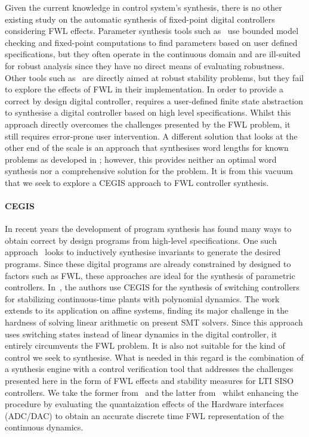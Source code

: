 \documentclass{sig-alternate-05-2015}
\begin{document}
Given the current knowledge in control system's synthesis, there is no other
existing study on the automatic synthesis of fixed-point digital controllers
considering FWL effects.  Parameter synthesis tools such
as~\cite{cimatti2013parameter} use bounded model checking and fixed-point
computations to find parameters based on user defined specifications, but
they often operate in the continuous domain and are ill-suited for robust
analysis since they have no direct means of evaluating robustness.  Other
tools such as~\cite{economakos2016automated} are directly aimed at robust
stability problems, but they fail to explore the effects of FWL in their
implementation.  In order to provide a correct by design digital controller,
\cite{alur2016compositional} requires a user-defined finite state
abstraction to synthesise a digital controller based on high level
specifications.  Whilst this approach directly overcomes the challenges
presented by the FWL problem, it still requires error-prone user
intervention.  A different solution that looks at the other end of the scale
is an approach that synthesises word lengths for known problems as developed
in \cite{jha2013swati}; however, this provides neither an optimal word
synthesis nor a comprehensive solution for the problem.  It is from this
vacuum that we seek to explore a CEGIS approach to FWL controller synthesis.

\paragraph{CEGIS}

In recent years the development of program synthesis has found many ways to
obtain correct by design programs from high-level specifications.  One such
approach~\cite{itzhaky2010simple} looks to inductively synthesise invariants
to generate the desired programs.  Since these digital programs are already
constrained by designed to factors such as FWL, these approaches are ideal
for the synthesis of parametric controllers. 
In~\cite{DBLP:conf/cdc/RavanbakhshS15}, the authors use CEGIS for the
synthesis of switching controllers for stabilizing continuous-time plants
with polynomial dynamics.  The work extends to its application on affine
systems, finding its major challenge in the hardness of solving linear
arithmetic on present SMT solvers.  Since this approach uses switching
states instead of linear dynamics in the digital controller, it entirely
circumvents the FWL problem.  It is also not suitable for the kind of
control we seek to synthesise.  What is needed in this regard is the
combination of a synthesis engine with a control verification tool that
addresses the challenges presented here in the form of FWL effects and
stability measures for LTI SISO controllers.  We take the former
from~\cite{DBLP:conf/lpar/DavidKL15} and the latter from~\cite{daes20161}
whilst enhancing the procedure by evaluating the quantaization effects of
the Hardware interfaces (ADC/DAC) to obtain an accurate discrete time FWL
representation of the continuous dynamics.
 
\end{document}
